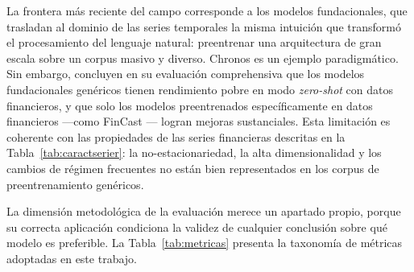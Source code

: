 La frontera más reciente del campo corresponde a los modelos fundacionales, que trasladan al dominio de las series temporales la misma intuición que transformó el procesamiento del lenguaje natural: preentrenar una arquitectura de gran escala sobre un corpus masivo y diverso. Chronos \parencite{Ansari2024} es un ejemplo paradigmático. Sin embargo, \textcite{Rahimikia2025} concluyen en su evaluación comprehensiva que los modelos fundacionales genéricos tienen rendimiento pobre en modo \textit{zero-shot} con datos financieros, y que solo los modelos preentrenados específicamente en datos financieros ---como FinCast \parencite{Zhu2025FinCast}--- logran mejoras sustanciales. Esta limitación es coherente con las propiedades de las series financieras descritas en la Tabla~\ref{tab:caractserier}: la no-estacionariedad, la alta dimensionalidad y los cambios de régimen frecuentes no están bien representados en los corpus de preentrenamiento genéricos.

La dimensión metodológica de la evaluación merece un apartado propio, porque su correcta aplicación condiciona la validez de cualquier conclusión sobre qué modelo es preferible. La Tabla~\ref{tab:metricas} presenta la taxonomía de métricas adoptadas en este trabajo.

